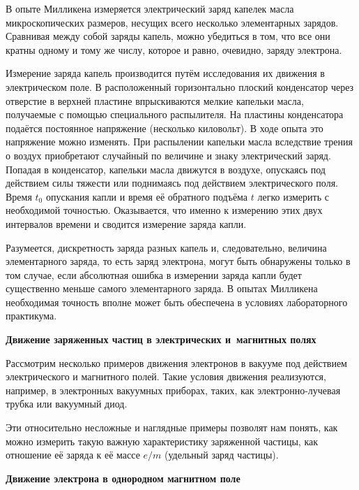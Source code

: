 \documentclass[a4paper,10pt,twoside]{article}
\begin{document}
В опыте Милликена измеряется электрический заряд капелек масла микроскопических размеров, несущих всего несколько
элементарных зарядов. Сравнивая между собой заряды капель, можно убедиться в том, что все они кратны одному и тому же числу, которое и равно, очевидно, заряду электрона.

Измерение заряда капель производится путём исследования их движения в электрическом поле. В расположенный горизонтально плоский конденсатор через отверстие в верхней пластине впрыскиваются мелкие капельки масла, получаемые с помощью специального распылителя. На пластины конденсатора подаётся постоянное напряжение (несколько киловольт). В ходе опыта это напряжение можно изменять. При распылении капельки масла вследствие трения о воздух приобретают случайный по величине и знаку электрический заряд. Попадая в конденсатор, капельки масла движутся в воздухе, опускаясь под действием силы тяжести или поднимаясь под действием электрического поля. Время $t_0$ опускания капли и время её обратного подъёма $t$ легко измерить с необходимой точностью. Оказывается, что именно к измерению этих двух интервалов времени и сводится измерение заряда капли.

Разумеется, дискретность заряда разных капель и, следовательно, величина элементарного заряда, то есть заряд электрона, могут быть обнаружены только в том случае, если абсолютная ошибка в измерении заряда капли будет существенно меньше самого элементарного заряда. В опытах Милликена необходимая точность вполне может быть обеспечена в условиях лабораторного практикума.

{\bf \Large Движение заряженных частиц в электрических и~магнитных полях}

Рассмотрим несколько примеров движения электронов в вакууме под действием электрического и магнитного полей. Такие
условия движения реализуются, например, в электронных вакуумных приборах, таких, как электронно-лучевая трубка или
вакуумный диод.

Эти относительно несложные и наглядные примеры позволят нам понять, как можно измерить такую важную характеристику
заряженной частицы, как отношение её заряда к её массе $e/m$ (удельный заряд частицы).

{\bf \large   Движение электрона в однородном магнитном поле}

\label{2.1}%
\end{document}
